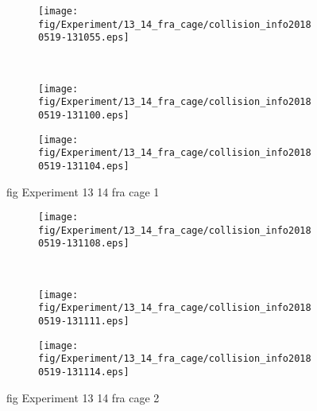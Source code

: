 \begin{figure}[H]
	\centering
	\begin{subfigure}[b]{0.45\textwidth}
		\texttt{[image: fig/Experiment/13\_14\_fra\_cage/collision\_info20180519-131055.eps]}
		\caption{}
		\label{fig:Experiment:13_14_fra_cage:collision_info20180519-131055}
	\end{subfigure}
	~
	\begin{subfigure}[b]{0.45\textwidth}
		\texttt{[image: fig/Experiment/13\_14\_fra\_cage/collision\_info20180519-131100.eps]}
		\caption{}
		\label{fig:Experiment:13_14_fra_cage:collision_info20180519-131100}
	\end{subfigure}

	\begin{subfigure}[b]{0.45\textwidth}
		\texttt{[image: fig/Experiment/13\_14\_fra\_cage/collision\_info20180519-131104.eps]}
		\caption{}
		\label{fig:Experiment:13_14_fra_cage:collision_info20180519-131104}
	\end{subfigure}
	\caption{fig Experiment 13 14 fra cage 1}
	\label{fig:Experiment:13_14_fra_cage:1}
\end{figure}

\begin{figure}[H]
	\centering
	\begin{subfigure}[b]{0.45\textwidth}
		\texttt{[image: fig/Experiment/13\_14\_fra\_cage/collision\_info20180519-131108.eps]}
		\caption{}
		\label{fig:Experiment:13_14_fra_cage:collision_info20180519-131108}
	\end{subfigure}
	~
	\begin{subfigure}[b]{0.45\textwidth}
		\texttt{[image: fig/Experiment/13\_14\_fra\_cage/collision\_info20180519-131111.eps]}
		\caption{}
		\label{fig:Experiment:13_14_fra_cage:collision_info20180519-131111}
	\end{subfigure}

	\begin{subfigure}[b]{0.45\textwidth}
		\texttt{[image: fig/Experiment/13\_14\_fra\_cage/collision\_info20180519-131114.eps]}
		\caption{}
		\label{fig:Experiment:13_14_fra_cage:collision_info20180519-131114}
	\end{subfigure}
	\caption{fig Experiment 13 14 fra cage 2}
	\label{fig:Experiment:13_14_fra_cage:2}
\end{figure}

